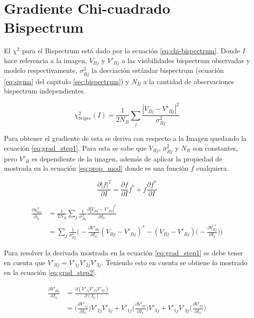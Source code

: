 \chapter{Gradiente Chi-cuadrado Bispectrum}
\label{finales:apendice1}
El $\chi^2$ para el Bispectrum está dado por la ecuación \ref{eq:chi-bispectrum}. Donde $I$ hace referencia a la imagen, $V_{Bj}$ y $V'_{Bj}$ a las visibilidades bispectrum observadas y modelo respectivamente, $\sigma^{2}_{Bj}$ la desviación estándar bispectrum (ecuación \ref{eq:sigma} del capitulo \ref{sec:bispectrum}) y $N_{B}$ a la cantidad de observaciones bispectrum independientes. 

\begin{equation}
    \chi^{2}_{bispec}(I) = \frac{1}{2N_{B}} \sum_{j} \frac{| V_{Bj}  - V'_{Bj}|^2}{\sigma^{2}_{Bj}}
    \label{eq:chi-bispectrum}
\end{equation}

Para obtener el gradiente de esta se deriva con respecto a la Imagen quedando la ecuación \ref{eq:grad_step1}. Para esta se sabe que $V_{Bj}$, $\sigma^{2}_{Bj}$ y $N_{B}$ son constantes, pero $V'_{B}$ es dependiente de la imagen, además de aplicar la propiedad de mostrada en la ecuación \ref{eq:prop_mod} donde es una función $f$ cualquiera.

\begin{equation}
\label{eq:prop_mod}
    \frac{\partial{|f|^2}}{\partial{I}} = \frac{\partial{f}}{\partial{I}} f^* + f \frac{\partial{f^*}}{\partial{I}}
\end{equation}


\begin{equation}
    \label{eq:grad_step1}
    \begin{split}
        \frac{\partial{\chi^{2}_{bis}}}{\partial_{I_{k}}} &= \frac{1}{2N_{B}} \sum_{j} \frac{1}{\sigma^{2}_{Bj}} \frac{\partial{|V_{Bj} - V'_{Bj}|^2}}{\partial I_{k}} \\&=
        \sum_{j} \frac{1}{\sigma^{2}_{Bj}} \bigg( -\frac{\partial{V'_{Bj}}}{\partial{I_{k}}} (V_{Bj} - V'_{Bj})^{*} - (V_{Bj} - V'_{Bj}) \bigg(-\frac{\partial{V^{'*}_{Bj}}}{\partial{I_{k}}}\bigg)  \bigg)
    \end{split}
\end{equation}

Para resolver la derivada mostrada en la ecuación \ref{eq:grad_step1} se debe tener en cuenta que $V'_{Bj} = V'_{1j}V'_{2j}V'_{3j}$. Teniendo esto en cuenta se obtiene lo mostrado en la ecuación \ref{eq:grad_step2}.

\begin{equation}
    \label{eq:grad_step2}
    \begin{split}
        \frac{\partial{V'_{Bj}}}{\partial{I_{k}}} &= \frac{\partial(V'_{1j}V'_{2j}V'_{3j})}{\partial(I_{k})} \\
        &= \bigg( \frac{\partial{V'_{1j}}}{\partial{I_{k}}}\bigg) V'_{2j} V'_{3j} + V'_{1j} \bigg( \frac{\partial{V'_{2j}}}{\partial{I_{k}}}\bigg) V'_{3j} + V'_{1j} V'_{2j} \bigg( \frac{\partial{V'_{3j}}}{\partial{I_{k}}}\bigg)
    \end{split}
\end{equation}

